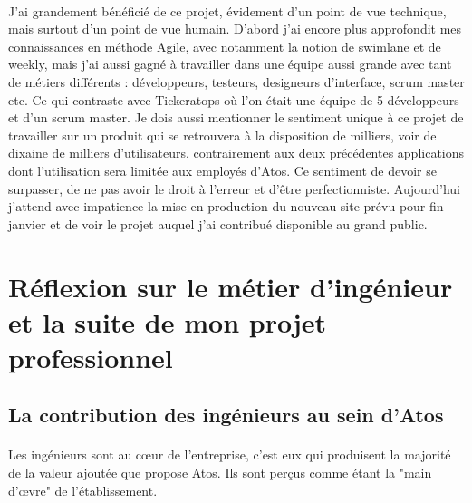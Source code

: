 \documentclass[12pt]{article}
\begin{document}
\begin {sloppypar}
\paragraph{}
J'ai grandement bénéficié de ce projet, évidement d'un point de vue technique, mais surtout d'un point 
de vue humain. D'abord j'ai encore plus approfondit mes connaissances en méthode Agile, avec notamment
la notion de swimlane et de weekly, mais j'ai aussi gagné à travailler dans une équipe aussi grande avec 
tant de métiers différents : développeurs, testeurs, designeurs d'interface, scrum master etc. Ce qui contraste
avec Tickeratops où l'on était une équipe de 5 développeurs et d'un scrum master. Je dois aussi mentionner
le sentiment unique à ce projet de travailler sur un produit qui se retrouvera à la disposition de milliers,
voir de dixaine de milliers d'utilisateurs, contrairement aux deux précédentes applications dont l'utilisation
sera limitée aux employés d'Atos. Ce sentiment de devoir se surpasser, de ne pas avoir le droit à l'erreur 
et d'être perfectionniste. Aujourd'hui j'attend avec impatience la mise en production du nouveau site 
prévu pour fin janvier et de voir le projet auquel j'ai contribué disponible au grand public.

\newpage
\section{Réflexion sur le métier d'ingénieur et la suite de mon projet professionnel}
\subsection{La contribution des ingénieurs au sein d'Atos}
\paragraph{}
Les ingénieurs sont au cœur de l'entreprise, c'est eux qui produisent la majorité de la valeur 
ajoutée que propose Atos. Ils sont perçus comme étant la "main d'œvre" de l'établissement.

\end{sloppypar}
\end{document}
